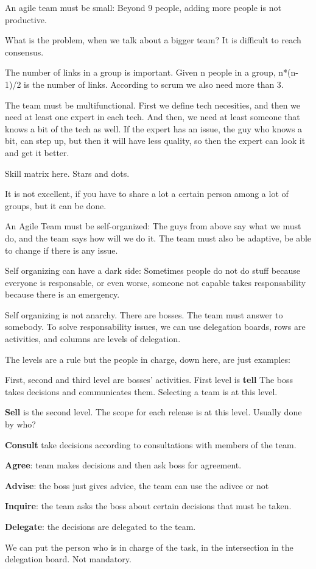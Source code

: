 \documentclass[a4paper,12pt]{article}
\begin{document}
An agile team must be small: Beyond 9 people, adding more people is not productive.

What is the problem, when we talk about a bigger team? It is difficult to reach consensus.

The number of links in a group is important. Given n people in a group, n*(n-1)/2 is the number of links. According to scrum we also need more than 3.

The team must be multifunctional. First we define tech necesities, and then we need at least one expert in each tech. And then, we need at least someone that knows a bit of the tech as well. If the expert has an issue, the guy who knows a bit, can step up, but then it will have less quality, so then the expert can look it and get it better.

Skill matrix here. Stars and dots.

It is not excellent, if you have to share a lot a certain person among a lot of groups, but it can be done.

An Agile Team must be self-organized: The guys from above say what we must do, and the team says how will we do it. The team must also be adaptive, be able to change if there is any issue.

Self organizing can have a dark side: Sometimes people do not do stuff because everyone is responsable, or even worse, someone not capable takes responsability because there is an emergency.

Self organizing is not anarchy. There are bosses. The team must answer to somebody. To solve responsability issues, we can use delegation boards, rows are activities, and columns are levels of delegation.

The levels are a rule but the people in charge, down here, are just examples:

First, second and third level are bosses' activities. First level is \textbf{tell} The boss takes decisions and communicates them. Selecting a team is at this level.

\textbf{ Sell} is the second level. The scope for each release is at this level. Usually done by who?

\textbf{Consult} take decisions according to consultations with members of the team.

\textbf{Agree}: team makes decisions and then ask boss for agreement.

\textbf{Advise}: the boss just gives advice, the team can use the adivce or not

\textbf{Inquire}: the team asks the boss about certain decisions that must be taken.

\textbf{Delegate}: the decisions are delegated to the team.

We can put the person who is in charge of the task, in the intersection in the delegation board. Not mandatory.
\end{document}
